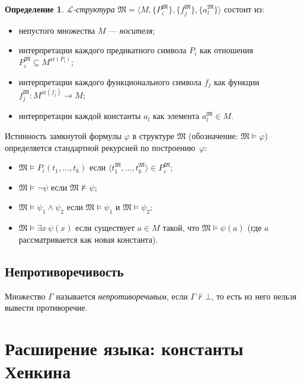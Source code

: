 \documentclass[12pt, a4paper]{article}
\theoremstyle{plain}
\theoremstyle{definition}
\newtheorem{definition}[theorem]{Определение}
\newcommand{\proves}{\vdash}
\renewcommand{\models}{\vDash}
\newcommand{\Lang}{\mathcal{L}}
\newcommand{\Struct}{\mathfrak{M}}
\newcommand{\tuple}[1]{\langle #1 \rangle}
\begin{document}
\begin{definition}
\emph{$\Lang$-структура} $\Struct = \tuple{M, \{P_i^{\Struct}\}, \{f_j^{\Struct}\}, \{a_l^{\Struct}\}}$
состоит из:
\begin{itemize}
  \item непустого множества $M$ — \emph{носителя};
  \item интерпретации каждого предикатного символа $P_i$ как отношения
        $P_i^{\Struct} \subseteq M^{\text{ar}(P_i)}$;
  \item интерпретации каждого функционального символа $f_j$ как функции
        $f_j^{\Struct}\colon M^{\text{ar}(f_j)} \to M$;
  \item интерпретации каждой константы $a_l$ как элемента $a_l^{\Struct} \in M$.
\end{itemize}
\end{definition}

Истинность замкнутой формулы $\varphi$ в структуре $\Struct$
(обозначение: $\Struct \models \varphi$) определяется стандартной
рекурсией по построению~$\varphi$:
\begin{itemize}
  \item $\Struct \models P_i(t_1,\ldots,t_k)$ если
        $\tuple{t_1^{\Struct},\ldots,t_k^{\Struct}} \in P_i^{\Struct}$;
  \item $\Struct \models \neg\psi$ если $\Struct \not\models \psi$;
  \item $\Struct \models \psi_1 \wedge \psi_2$ если
        $\Struct \models \psi_1$ и $\Struct \models \psi_2$;
  \item $\Struct \models \exists x\,\psi(x)$ если существует $a \in M$ такой,
        что $\Struct \models \psi(a)$ (где $a$ рассматривается как новая константа).
\end{itemize}

\subsection{Непротиворечивость}

Множество $\Gamma$ называется \emph{непротиворечивым}, если $\Gamma \not\proves \bot$,
то есть из него нельзя вывести противоречие.

\section{Расширение языка: константы Хенкина}
\end{document}
